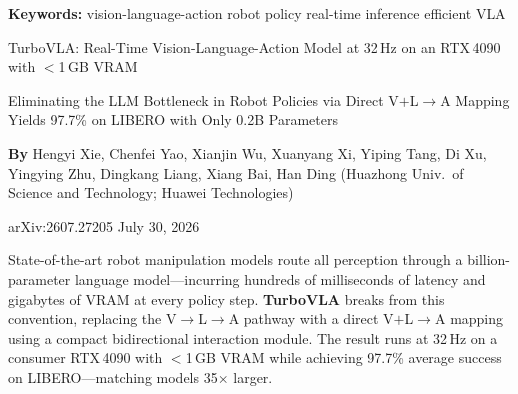 \documentclass[10pt,twocolumn]{article}
\begin{document}
\setlength{\parindent}{0pt}
\setlength{\parskip}{4pt}

{\small\color{keywordgray}\textbf{Keywords:}
  vision-language-action \textbullet{}
  robot policy \textbullet{}
  real-time inference \textbullet{}
  efficient VLA}\par\vspace{4pt}

{\LARGE\bfseries\raggedright
  TurboVLA: Real-Time Vision-Language-Action Model
  at 32\,Hz on an RTX\,4090 with $<$1\,GB VRAM}\par\vspace{4pt}

{\large\itshape\raggedright
  Eliminating the LLM Bottleneck in Robot Policies via Direct
  V$+$L$\to$A Mapping Yields 97.7\% on LIBERO with Only
  0.2B Parameters}\par\vspace{6pt}

{\small\textbf{By} Hengyi Xie, Chenfei Yao, Xianjin Wu, Xuanyang Xi,
  Yiping Tang, Di Xu, Yingying Zhu, Dingkang Liang, Xiang Bai, Han Ding
  (Huazhong Univ.\ of Science and Technology; Huawei Technologies)}\par\vspace{2pt}

{\small\color{keywordgray}arXiv:2607.27205 \textbullet{} July 30, 2026}
\par\vspace{2pt}\noindent{\color{rulered}\rule{\columnwidth}{0.6pt}}\vspace{6pt}

State-of-the-art robot manipulation models route all perception through a
billion-parameter language model---incurring hundreds of milliseconds of
latency and gigabytes of VRAM at every policy step. \textbf{TurboVLA}
breaks from this convention, replacing the V$\to$L$\to$A pathway with a
direct V$+$L$\to$A mapping using a compact bidirectional interaction module.
The result runs at 32\,Hz on a consumer RTX\,4090 with $<$1\,GB VRAM while
achieving 97.7\% average success on LIBERO---matching models 35$\times$
larger.
\end{document}

